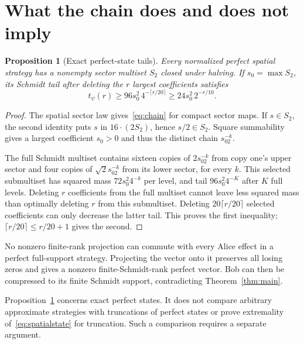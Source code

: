 \documentclass[11pt]{article}
\newtheorem{proposition}[theorem]{Proposition}
\theoremstyle{definition}
\newcommand{\mult}[2]{#1\mathbin{\cdot}#2}
\begin{document}
\section{What the chain does and does not imply}\label{sec:profile}
\begin{proposition}[Exact perfect-state tails]\label{prop:tails}
Every normalized perfect spatial strategy has a nonempty sector multiset $S_2$ closed under halving. If $s_0=\max S_2$, its Schmidt tail after deleting the $r$ largest coefficients satisfies
\begin{equation}\label{eq:taillower}
t_\psi(r)\geq96s_0^2\,4^{-\lceil r/20\rceil}
\geq24s_0^2\,2^{-r/10}.
\end{equation}
\end{proposition}
\begin{proof}
The spatial sector law gives~\eqref{eq:chain} for compact sector maps. If $s\in S_2$, the second identity puts $s$ in $\mult{16}{(2S_2)}$, hence $s/2\in S_2$. Square summability gives a largest coefficient $s_0>0$ and thus the distinct chain $s_02^{-k}$.

The full Schmidt multiset contains sixteen copies of $2s_02^{-k}$ from copy one's upper sector and four copies of $\sqrt2s_02^{-k}$ from its lower sector, for every $k$. This selected submultiset has squared mass $72s_0^2 4^{-k}$ per level, and tail $96s_0^2 4^{-K}$ after $K$ full levels. Deleting $r$ coefficients from the full multiset cannot leave less squared mass than optimally deleting $r$ from this submultiset. Deleting $20\lceil r/20\rceil$ selected coefficients can only decrease the latter tail. This proves the first inequality; $\lceil r/20\rceil\leq r/20+1$ gives the second.
\end{proof}

No nonzero finite-rank projection can commute with every Alice effect in a perfect full-support strategy. Projecting the vector onto it preserves all losing zeros and gives a nonzero finite-Schmidt-rank perfect vector. Bob can then be compressed to its finite Schmidt support, contradicting Theorem~\ref{thm:main}.

Proposition~\ref{prop:tails} concerns exact perfect states. It does not compare arbitrary approximate strategies with truncations of perfect states or prove extremality of~\eqref{eq:spatialstate} for truncation. Such a comparison requires a separate argument.
\end{document}
